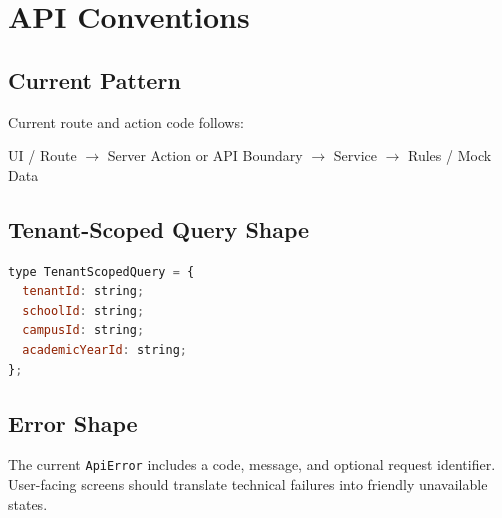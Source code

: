 \chapter{API Conventions}
\label{app:api}
\section{Current Pattern}
Current route and action code follows:
\begin{center}
UI / Route $\rightarrow$ Server Action or API Boundary $\rightarrow$ Service $\rightarrow$ Rules / Mock Data
\end{center}

\section{Tenant-Scoped Query Shape}
\begin{lstlisting}[language=JavaScript]
type TenantScopedQuery = {
  tenantId: string;
  schoolId: string;
  campusId: string;
  academicYearId: string;
};
\end{lstlisting}

\section{Error Shape}
The current \texttt{ApiError} includes a code, message, and optional request identifier. User-facing screens should translate technical failures into friendly unavailable states.
